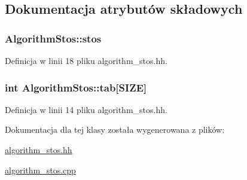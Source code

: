 \subsection{Dokumentacja atrybutów składowych}
\hypertarget{class_algorithm_stos_a0b803ecc25fd3586cf07969697367754}{
\subsubsection[{stos}]{ Algorithm\-Stos\-::stos\hspace{0.3cm}{\ttfamily [private]}}}\label{class_algorithm_stos_a0b803ecc25fd3586cf07969697367754}


Definicja w linii 18 pliku algorithm\-\_\-stos.\-hh.

\hypertarget{class_algorithm_stos_a2fb5db929aa54bf64794c812830d8648}{
\subsubsection[{tab}]{\setlength{\rightskip}{0pt plus 5cm}int Algorithm\-Stos\-::tab\mbox{[}{\bf S\-I\-Z\-E}\mbox{]}\hspace{0.3cm}{\ttfamily [private]}}}\label{class_algorithm_stos_a2fb5db929aa54bf64794c812830d8648}


Definicja w linii 14 pliku algorithm\-\_\-stos.\-hh.



Dokumentacja dla tej klasy została wygenerowana z plików\-:\begin{DoxyCompactItemize}
\item 
\hyperlink{algorithm__stos_8hh}{algorithm\-\_\-stos.\-hh}\item 
\hyperlink{algorithm__stos_8cpp}{algorithm\-\_\-stos.\-cpp}\end{DoxyCompactItemize}
